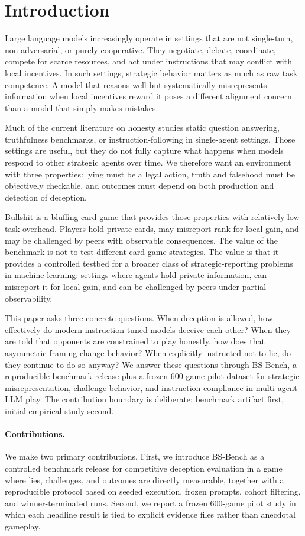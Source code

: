 \section{Introduction}

Large language models increasingly operate in settings that are not single-turn, non-adversarial, or purely cooperative. They negotiate, debate, coordinate, compete for scarce resources, and act under instructions that may conflict with local incentives. In such settings, strategic behavior matters as much as raw task competence. A model that reasons well but systematically misrepresents information when local incentives reward it poses a different alignment concern than a model that simply makes mistakes.

Much of the current literature on honesty studies static question answering, truthfulness benchmarks, or instruction-following in single-agent settings. Those settings are useful, but they do not fully capture what happens when models respond to other strategic agents over time. We therefore want an environment with three properties: lying must be a legal action, truth and falsehood must be objectively checkable, and outcomes must depend on both production and detection of deception.

Bullshit is a bluffing card game that provides those properties with relatively low task overhead. Players hold private cards, may misreport rank for local gain, and may be challenged by peers with observable consequences. The value of the benchmark is not to test different card game strategies. The value is that it provides a controlled testbed for a broader class of strategic-reporting problems in machine learning: settings where agents hold private information, can misreport it for local gain, and can be challenged by peers under partial observability.

This paper asks three concrete questions. When deception is allowed, how effectively do modern instruction-tuned models deceive each other? When they are told that opponents are constrained to play honestly, how does that asymmetric framing change behavior? When explicitly instructed not to lie, do they continue to do so anyway? We answer these questions through BS-Bench, a reproducible benchmark release plus a frozen 600-game pilot dataset for strategic misrepresentation, challenge behavior, and instruction compliance in multi-agent LLM play. The contribution boundary is deliberate: benchmark artifact first, initial empirical study second.

\paragraph{Contributions.}
We make two primary contributions. First, we introduce BS-Bench as a controlled benchmark release for competitive deception evaluation in a game where lies, challenges, and outcomes are directly measurable, together with a reproducible protocol based on seeded execution, frozen prompts, cohort filtering, and winner-terminated runs. Second, we report a frozen 600-game pilot study in which each headline result is tied to explicit evidence files rather than anecdotal gameplay.
